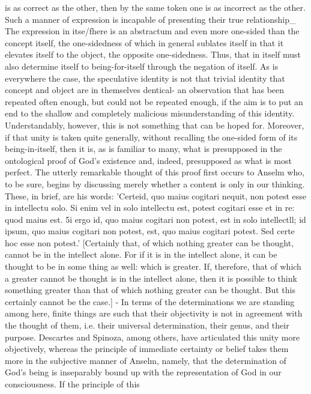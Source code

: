 is as correct as the other, then by the same token one is as incorrect
as the other. Such a manner of expression is incapable of presenting
their true relationship_ The expression in itse/fhere is an abstractum
and even more one-sided than the concept itself, the one-sidedness
of which in general sublates itself in that it elevates
itself to the object, the opposite one-sidedness.
Thus, that in itself must also determine itself to being-for-itself through the
negation of itself.
As is everywhere the case, the speculative identity is
not that trivial identity that concept and object are in themselves
dentical- an observation that has been repeated often enough, but
could not be repeated enough, if the aim is to put an end to the
shallow and completely malicious misunderstanding of this identity.
Understandably, however, this is not something that can be hoped for.
Moreover, if that unity is taken quite generally, without recalling
the one-sided form of its being-in-itself, then it is, as is familiar to
many, what is presupposed in the ontological proof of God's existence
and, indeed, presupposed as what is most perfect. The utterly
remarkable thought of this proof first occurs to Anselm who, to be
sure, begins by discussing merely whether a content is only in our
thinking. These, in brief, are his words: 'Certeid, quo maius cogitari
nequit, non potest esse in intellectu solo. Si enim vel in solo
intellectu est, potest cogitari esse et in re: quod maius est. 5i ergo id,
quo maius cogitari non potest, est in solo intellectll; id ipsum, quo
maius cogitari non potest, est, quo maius cogitari potest. Sed certe
hoc esse non potest.' [Certainly that, of which nothing greater can
be thought, cannot be in the intellect alone. For if it is in the
intellect alone, it can be thought to be in some thing as well: which
is greater. If, therefore, that of which a greater cannot be thought is
in the intellect alone, then it is possible to think something greater
than that of which nothing greater can be thought. But this certainly
cannot be the case.] - In terms of the determinations we are
standing among here, finite things are such that their objectivity is
not in agreement with the thought of them, i.e. their universal
determination, their genus, and their purpose. Descartes and
Spinoza, among others, have articulated this unity more objectively,
whereas the principle of immediate certainty or belief takes them
more in the subjective manner of Anselm, namely, that the
determination of God's being is inseparably bound up with the
representation of God in our consciousness. If the principle of this
